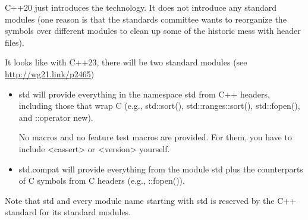 
C++20 just introduces the technology. It does not introduce any standard modules (one reason is that the standards committee wants to reorganize the symbols over different modules to clean up some of the historic mess with header files).

It looks like with C++23, there will be two standard modules (see \url{http://wg21.link/p2465})

\begin{itemize}
\item 
std will provide everything in the namespace std from C++ headers, including those that wrap C (e.g., std::sort(), std::ranges::sort(), std::fopen(), and ::operator new).

No macros and no feature test macros are provided. For them, you have to include <cassert> or <version> yourself.

\item 
std.compat will provide everything from the module std plus the counterparts of C symbols from C headers (e.g., ::fopen()).
\end{itemize}

Note that std and every module name starting with std is reserved by the C++ standard for its standard modules.













